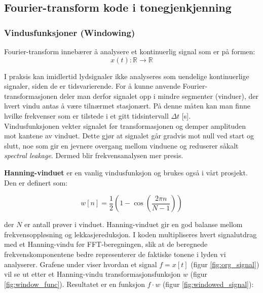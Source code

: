 \subsection{Fourier-transform kode i tonegjenkjenning}

\subsubsection{Vindusfunksjoner (Windowing)}
Fourier-transform innebærer å analysere et kontinuerlig signal som er på formen:
\[
x(t): \mathbb{R} \rightarrow \mathbb{R}
\]

\noindent
I praksis kan imidlertid lydsignaler ikke analyseres som uendelige kontinuerlige signaler, siden de er tidsvarierende. 
For å kunne anvende Fourier-transformasjonen deler man derfor signalet opp i mindre segmenter (vinduer), der hvert vindu antas å være tilnærmet stasjonært. 
På denne måten kan man finne hvilke frekvenser som er tilstede i et gitt tidsintervall $\Delta t$ [s]. \\

Vindusfunksjonen vekter signalet før transformasjonen og demper amplituden mot kantene av vinduet. 
Dette gjør at signalet går gradvis mot null ved start og slutt, noe som gir en jevnere overgang mellom vinduene og reduserer såkalt \textit{spectral leakage}. 
Dermed blir frekvensanalysen mer presis. 

\textbf{Hanning-vinduet} er en vanlig vindusfunksjon og brukes også i vårt prosjekt. Den er definert som:

\begin{equation}
    w[n]=\frac{1}{2} \left( 1 - \cos{\left( \frac{2 \pi n}{N - 1}\right)} \right)
    \label{eq:HanningVinduFunksjon}
\end{equation}

\noindent
der $N$ er antall prøver i vinduet. 
Hanning-vinduet gir en god balanse mellom frekvensoppløsning og lekkasjereduksjon. 
I koden multipliseres hvert signalutdrag med et Hanning-vindu før FFT-beregningen, slik at de beregnede frekvenskomponentene bedre representerer de faktiske tonene i lyden vi analyserer. Grafene under viser hvordan et signal $f = x[t]$ (figur \ref{fig:org_signal}) vil se ut etter et Hanning-vindu transformasjonsfunksjon $w$ (figur \ref{fig:window_func}). Resultatet er en funksjon $f \cdot w$ (figur \ref{fig:windowed_signal}):

